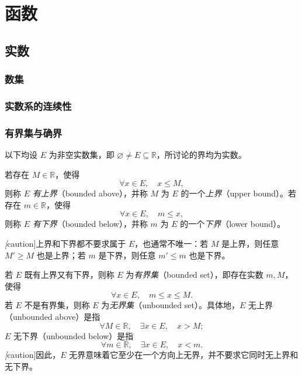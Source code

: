 \setcounter{chapter}{0} %
\chapter{函数}
\label{chap:functions}

\section{实数}
\label{sec:real-numbers}

\subsection{数集}
\label{subsec:number-sets}

\subsection{实数系的连续性}
\label{subsec:continuity-of-real-numbers}

\subsection{有界集与确界}
\label{subsec:bounded-sets-and-bounds}

以下均设 $E$ 为非空实数集，即 $\varnothing\neq E\subseteq\mathbb{R}$，所讨论的界均为实数。

\begin{definition}
\label{def:upper-and-lower-bounds}
若存在 $M\in\mathbb{R}$，使得
\[
    \forall x\in E,\quad x\leq M,
\]
则称 $E$ \emph{有上界}（bounded above），并称 $M$ 为 $E$ 的一个\emph{上界}（upper bound）。若存在 $m\in\mathbb{R}$，使得
\[
    \forall x\in E,\quad m\leq x,
\]
则称 $E$ \emph{有下界}（bounded below），并称 $m$ 为 $E$ 的一个\emph{下界}（lower bound）。
\end{definition}

\emph[caution]{上界和下界都不要求属于 $E$，也通常不唯一}：若 $M$ 是上界，则任意 $M'\geq M$ 也是上界；若 $m$ 是下界，则任意 $m'\leq m$ 也是下界。

\begin{definition}
\label{def:bounded-and-unbounded-sets}
若 $E$ 既有上界又有下界，则称 $E$ 为\emph{有界集}（bounded set），即存在实数 $m,M$，使得
\[
    \forall x\in E,\quad m\leq x\leq M.
\]
若 $E$ 不是有界集，则称 $E$ 为\emph{无界集}（unbounded set）。具体地，$E$ 无上界（unbounded above）是指
\[
    \forall M\in\mathbb{R},\quad \exists x\in E,\quad x>M;
\]
$E$ 无下界（unbounded below）是指
\[
    \forall m\in\mathbb{R},\quad \exists x\in E,\quad x<m.
\]
\emph[caution]{因此，$E$ 无界意味着它至少在一个方向上无界，并不要求它同时无上界和无下界。}
\end{definition}


